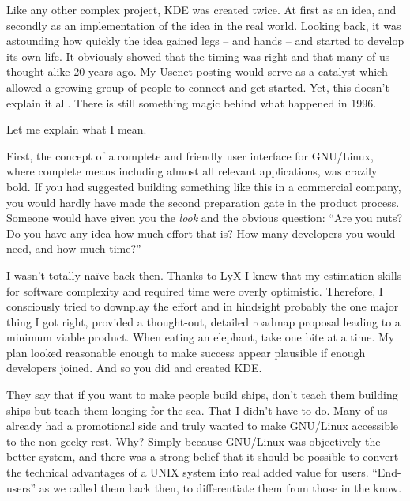 

\noindent{}Like any other complex project, KDE was created twice. At first as an idea, and secondly as an implementation of the idea in the real world. Looking back, it was astounding how quickly the idea gained legs – and hands – and started to develop its own life. It obviously showed that the timing was right and that many of us thought alike 20 years ago. My Usenet posting would serve as a catalyst which allowed a growing group of people to connect and get started. Yet, this doesn’t explain it all. There is still something magic behind what happened in 1996.

Let me explain what I mean.
 
First, the concept of a complete and friendly user interface for GNU/Linux, where complete means including almost all relevant applications, was crazily bold. If you had suggested building something like this in a commercial company, you would hardly have made the second preparation gate in the product process. Someone would have given you the \textit{look} and the obvious question: “Are you nuts? Do you have any idea how much effort that is? How many developers you would need, and how much time?”
 
I wasn’t totally naïve back then. Thanks to LyX I knew that my estimation skills for software complexity and required time were overly optimistic. Therefore, I consciously tried to downplay the effort and in hindsight probably the one major thing I got right, provided a thought-out, detailed roadmap proposal leading to a minimum viable product. When eating an elephant, take one bite at a time. My plan looked reasonable enough to make success appear plausible if enough developers joined. And so you did and created KDE.
 
They say that if you want to make people build ships, don’t teach them building ships but teach them longing for the sea. That I didn’t have to do. Many of us already had a promotional side and truly wanted to make GNU/Linux accessible to the non-geeky rest. Why? Simply because GNU/Linux was objectively the better system, and there was a strong belief that it should be possible to convert the technical advantages of a UNIX system into real added value for users. “End-users” as we called them back then, to differentiate them from those in the know.
 
